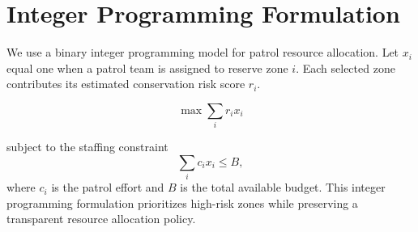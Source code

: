 \section{Integer Programming Formulation}
We use a binary integer programming model for patrol resource allocation.
Let $x_i$ equal one when a patrol team is assigned to reserve zone $i$.
Each selected zone contributes its estimated conservation risk score $r_i$.

\begin{equation}
\max \sum_i r_i x_i
\end{equation}

subject to the staffing constraint
\begin{equation}
\sum_i c_i x_i \leq B,
\end{equation}
where $c_i$ is the patrol effort and $B$ is the total available budget.
This integer programming formulation prioritizes high-risk zones while
preserving a transparent resource allocation policy.
